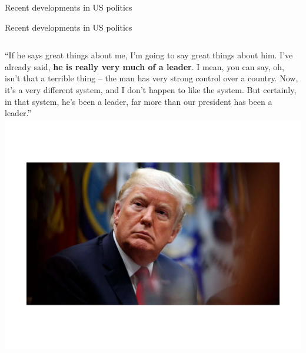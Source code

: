 \documentclass[10pt]{beamer}
\begin{document}
\begin{frame}{Recent developments in US politics}
	\begin{figure}
	\setcounter{subfigure}{0}
	\footnotesize
	\centering
	\hspace{0.1cm}
	\end{figure}
\end{frame}

\begin{frame}{Recent developments in US politics}
	\begin{columns}
    \small
	``If he says great things about me, I'm going to say great things about him. I've already said, \textbf{he is really very much of a leader}. I mean, you can say, oh, isn't that a terrible thing -- the man has very strong control over a country. Now, it's a very different system, and I don't happen to like the system. But certainly, in that system, he's been a leader, far more than our president has been a leader.''	\vspace{0.2cm}
    \centering
    \includegraphics[scale=0.55]{Figs/trump}
    \end{columns}
\end{frame}
\end{document}
